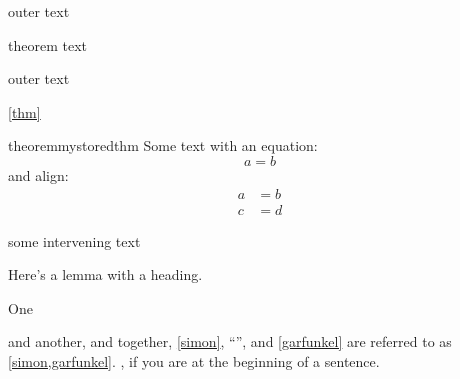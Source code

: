 \documentclass{article}
\begin{document}
\listoftheorems

outer text

\begin{theorem}\label{thm}
theorem text
\end{theorem}

outer text

\autoref{thm}

\begin{restatable}{theorem}{mystoredthm}
Some text with an equation:
\begin{equation}
a=b
\end{equation}
and align:
\begin{align}
a &= b \\
c &= d
\end{align}
\end{restatable}

some intervening text

\begin{lemma}[heading] %
Here's a lemma with a heading.
\end{lemma}

\mystoredthm*

\begin{callmeal}[Simon]\label{simon}
One
\end{callmeal}
\begin{callmeal}\label{garfunkel}
and another, and together,
\autoref{simon}, ``'',
and \cref{garfunkel} are referred
to as \cref{simon,garfunkel}.
, if you are at
the beginning of a sentence.
\end{callmeal}
\end{document}
